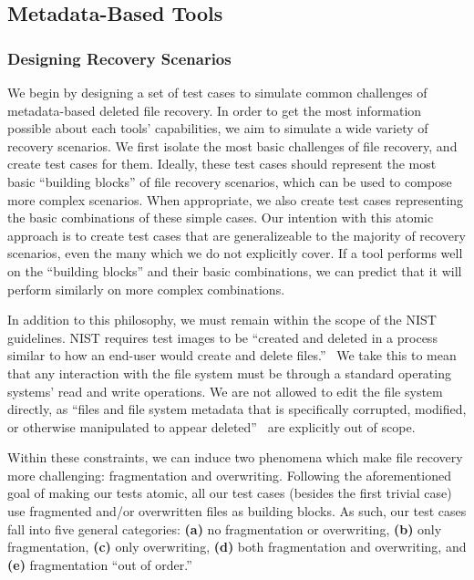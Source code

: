 \subsection{Metadata-Based Tools}
\subsubsection{Designing Recovery Scenarios}

We begin by designing a set of test cases to simulate common challenges of metadata-based deleted file recovery.
In order to get the most information possible about each tools' capabilities, we aim to simulate a wide variety of recovery scenarios.
We first isolate the most basic challenges of file recovery, and create test cases for them.
Ideally, these test cases should represent the most basic ``building blocks'' of file recovery scenarios, which can be used to compose more complex scenarios.
When appropriate, we also create test cases representing the basic combinations of these simple cases.
Our intention with this atomic approach is to create test cases that are generalizeable to the majority of recovery scenarios, even the many which we do not explicitly cover.
If a tool performs well on the ``building blocks'' and their basic combinations, we can predict that it will perform similarly on more complex combinations.

In addition to this philosophy, we must remain within the scope of the NIST guidelines.
NIST requires test images to be ``created and deleted in a process similar to how an end-user would create and delete files.''~\cite{meta:dfr:standards}
We take this to mean that any interaction with the file system must be through a standard operating systems'  read and write operations.
We are not allowed to edit the file system directly, as ``files and file system metadata that is specifically corrupted, modified, or otherwise manipulated to appear deleted''~\cite{meta:dfr:standards} are explicitly out of scope.

Within these constraints, we can induce two phenomena which make file recovery more challenging: fragmentation and overwriting.
Following the aforementioned goal of making our tests atomic, all our test cases (besides the first trivial case) use fragmented and/or overwritten files as building blocks.
As such, our test cases fall into five general categories:
{\bf(a)} no fragmentation or overwriting, 
{\bf (b)} only fragmentation,
{\bf (c)} only overwriting,
{\bf (d)} both fragmentation and overwriting,
and {\bf (e)} fragmentation ``out of order.''


